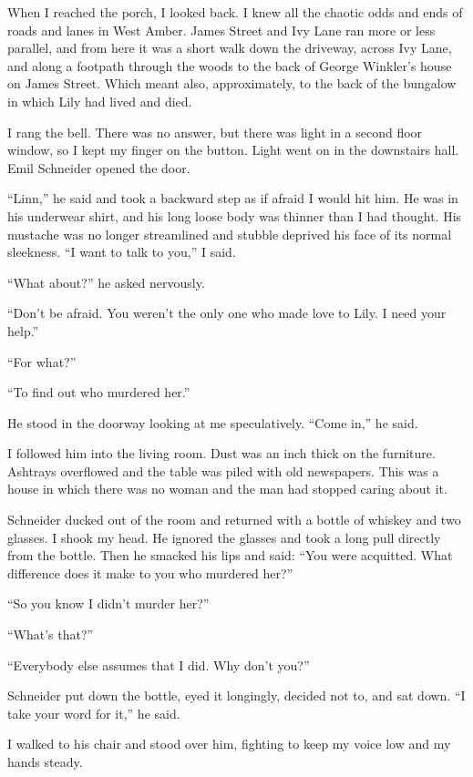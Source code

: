 \documentclass{novel}
\begin{document}
When I reached the porch, I looked back. I knew all the chaotic odds and ends of roads and lanes in West Amber. James Street and Ivy Lane ran more or less parallel, and from here it was a short walk down the driveway, across Ivy Lane, and along a footpath through the woods to the back of George Winkler’s house on James Street. Which meant also, approximately, to the back of the bungalow in which Lily had lived and died.

\scenestars

I rang the bell. There was no answer, but there was light in a second floor window, so I kept my finger on the button. Light went on in the downstairs hall. Emil Schneider opened the door.

“Linn,” he said and took a backward step as if afraid I would hit him. He was in his underwear shirt, and his long loose body was thinner than I had thought. His mustache was no longer streamlined and stubble deprived his face of its normal sleekness. “I want to talk to you,” I said.

“What about?” he asked nervously.

“Don’t be afraid. You weren’t the only one who made love to Lily. I need your help.”

“For what?”

“To find out who murdered her.”

He stood in the doorway looking at me speculatively. “Come in,” he said.

I followed him into the living room. Dust was an inch thick on the furniture. Ashtrays overflowed and the table was piled with old newspapers. This was a house in which there was no woman and the man had stopped caring about it.

Schneider ducked out of the room and returned with a bottle of whiskey and two glasses. I shook my head. He ignored the glasses and took a long pull directly from the bottle. Then he smacked his lips and said: “You were acquitted. What difference does it make to you who murdered her?”

“So you know I didn’t murder her?”

“What’s that?”

“Everybody else assumes that I did. Why don’t you?”

Schneider put down the bottle, eyed it longingly, decided not to, and sat down. “I take your word for it,” he said.

I walked to his chair and stood over him, fighting to keep my voice low and my hands steady.
\end{document}
